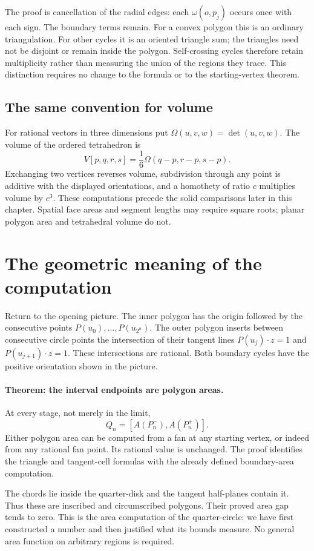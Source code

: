 The proof is cancellation of the radial edges: each $\omega(o,p_j)$ occurs
once with each sign. The boundary terms remain. For a convex polygon this
is an ordinary triangulation. For other cycles it is an oriented triangle
sum; the triangles need not be disjoint or remain inside the polygon.
Self-crossing cycles therefore retain multiplicity rather than measuring
the union of the regions they trace. This distinction requires no change to
the formula or to the starting-vertex theorem.

\subsection{The same convention for volume}
For rational vectors in three dimensions put
$\Omega(u,v,w)=\det(u,v,w)$. The volume of the ordered tetrahedron is
\[
 V[p,q,r,s]=\frac16\Omega(q-p,r-p,s-p).
\]
Exchanging two vertices reverses volume, subdivision through any point is
additive with the displayed orientations, and a homothety of ratio $c$
multiplies volume by $c^3$. These computations precede the solid comparisons
later in this chapter. Spatial face areas and segment lengths may require
square roots; planar polygon area and tetrahedral volume do not.

\section{The geometric meaning of the computation}
\label{thm:geometric-pi-validity}
Return to the opening picture. The inner polygon has the origin followed by
the consecutive points $P(u_0),\ldots,P(u_{2^n})$. The outer polygon inserts
between consecutive circle points the intersection of their tangent lines
$P(u_j)\cdot z=1$ and $P(u_{j+1})\cdot z=1$.
These intersections are rational. Both boundary cycles have the positive
orientation shown in the picture.

\paragraph{Theorem: the interval endpoints are polygon areas.}
\label{thm:quarter-circle-polygons}
At every stage, not merely in the limit,
\[
 \boxed{Q_n=[A(P_n^-),A(P_n^+)].}
\]
Either polygon area can be computed from a fan at any starting vertex, or
indeed from any rational fan point. Its rational value is unchanged.
The proof identifies the triangle and tangent-cell formulas with the
already defined boundary-area computation.

The chords lie inside the quarter-disk and the tangent half-planes contain
it. Thus these are inscribed and circumscribed polygons. Their proved area
gap tends to zero. This is the area computation of the quarter-circle:
we have first constructed a number and then justified what its bounds measure.
No general area function on arbitrary regions is required.

